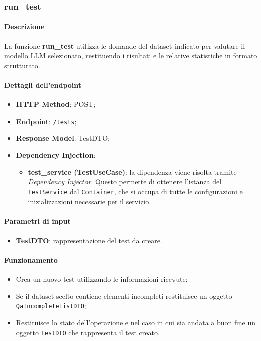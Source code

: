 \subsubsection{run\_test}  
\label{subsubsec:run_test}

\paragraph{Descrizione}  
La funzione \textbf{run\_test} utilizza le domande del dataset indicato per valutare il modello LLM selezionato, restituendo i risultati e le relative statistiche in formato strutturato.


\paragraph{Dettagli dell'endpoint}
\begin{itemize}
    \item \textbf{HTTP Method}: POST;
    \item \textbf{Endpoint}: \texttt{/tests};
    \item \textbf{Response Model}: TestDTO;
    \item \textbf{Dependency Injection}: 
    \begin{itemize}
        \item \textbf{test\_service (TestUseCase)}: la dipendenza viene risolta tramite \textit{Dependency Injector}. Questo permette di ottenere l'istanza del \texttt{TestService} dal \texttt{Container}, che si occupa di tutte le configurazioni e inizializzazioni necessarie per il servizio.
    \end{itemize}
\end{itemize}

\paragraph{Parametri di input}
\begin{itemize}
    \item \textbf{TestDTO}: rappresentazione del test da creare.
\end{itemize}

\paragraph{Funzionamento}
\begin{itemize}
    \item Crea un nuovo test utilizzando le informazioni ricevute;
    \item Se il dataset scelto contiene elementi incompleti restituisce un oggetto \texttt{QaIncompleteListDTO}; 
    \item Restituisce lo stato dell'operazione e nel  caso in cui sia andata a buon fine un oggetto \texttt{TestDTO} che rappresenta il test creato.
\end{itemize}

